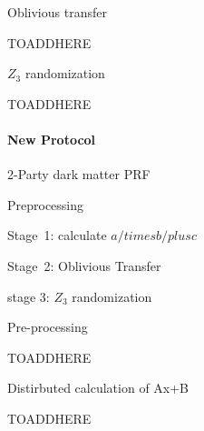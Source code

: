 \begin{algorithm}
\caption{Oblivious transfer}
\begin{algorithmic}
	
		\STATE TOADDHERE
	
\end{algorithmic}
\end{algorithm}


\begin{algorithm}
	\caption{$Z_3$ randomization}
	\begin{algorithmic}
		
			\STATE TOADDHERE
		
\end{algorithmic}
	\end{algorithm}



\paragraph{New Protocol}

\begin{algorithm}
	\caption{2-Party dark matter PRF}
	\begin{algorithmic}
		
		\STATE Preprocessing
		
		\STATE Stage\ 1: calculate $a /times b /plus c$
		
		\STATE Stage\ 2: Oblivious Transfer
		
		\STATE stage 3: $Z_3$ randomization  
		
	\end{algorithmic}
\end{algorithm}

\begin{algorithm}
	\caption{Pre-processing}
	\begin{algorithmic}
		
		\STATE TOADDHERE
		
	\end{algorithmic}
\end{algorithm}

\begin{algorithm}
	\caption{Distirbuted calculation of Ax+B}
	\begin{algorithmic}
		
		\STATE TOADDHERE
		
	\end{algorithmic}
\end{algorithm}

